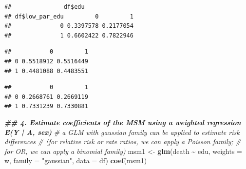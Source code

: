 \documentclass[
]{book}
\newenvironment{Shaded}{\begin{snugshade}}{\end{snugshade}}
\newcommand{\AttributeTok}[1]{\textcolor[rgb]{0.13,0.29,0.53}{#1}}
\newcommand{\CommentTok}[1]{\textcolor[rgb]{0.56,0.35,0.01}{\textit{#1}}}
\newcommand{\DecValTok}[1]{\textcolor[rgb]{0.00,0.00,0.81}{#1}}
\newcommand{\DocumentationTok}[1]{\textcolor[rgb]{0.56,0.35,0.01}{\textbf{\textit{#1}}}}
\newcommand{\FunctionTok}[1]{\textcolor[rgb]{0.13,0.29,0.53}{\textbf{#1}}}
\newcommand{\NormalTok}[1]{#1}
\newcommand{\OtherTok}[1]{\textcolor[rgb]{0.56,0.35,0.01}{#1}}
\newcommand{\SpecialCharTok}[1]{\textcolor[rgb]{0.81,0.36,0.00}{\textbf{#1}}}
\newcommand{\StringTok}[1]{\textcolor[rgb]{0.31,0.60,0.02}{#1}}
\begin{document}
\begin{verbatim}
##               df$edu
## df$low_par_edu         0         1
##              0 0.3397578 0.2177054
##              1 0.6602422 0.7822946
\end{verbatim}

\begin{Shaded}
\end{Shaded}

\begin{verbatim}
##           0         1
## 0 0.5518912 0.5516449
## 1 0.4481088 0.4483551
\end{verbatim}

\begin{Shaded}
\end{Shaded}

\begin{verbatim}
##           0         1
## 0 0.2668761 0.2669119
## 1 0.7331239 0.7330881
\end{verbatim}

\begin{Shaded}
\begin{Highlighting}[]
\DocumentationTok{\#\# 4. Estimate coefficients of the MSM using a weighted regression E(Y | A, sex)}
\CommentTok{\# a GLM with gaussian family can be applied to estimate risk differences}
\CommentTok{\# (for relative risk or rate ratios, we can apply a Poisson family; }
\CommentTok{\#  for OR, we can apply a binomial family)}
\NormalTok{msm1 }\OtherTok{\textless{}{-}} \FunctionTok{glm}\NormalTok{(death }\SpecialCharTok{\textasciitilde{}}\NormalTok{ edu,}
           \AttributeTok{weights =}\NormalTok{ w,}
           \AttributeTok{family =} \StringTok{"gaussian"}\NormalTok{,}
           \AttributeTok{data =}\NormalTok{ df)}
\FunctionTok{coef}\NormalTok{(msm1)}
\end{Highlighting}
\end{Shaded}
\end{document}
